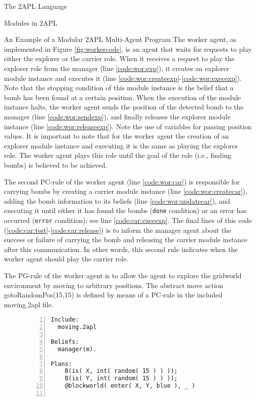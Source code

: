 \begin{chapter}{The 2APL Language}
\begin{section}{Modules in 2APL}
\begin{subsection}{An Example of a Modular 2APL Multi-Agent Program}
The worker agent, as implemented in Figure \ref{fig:workercode}, is
an agent that waits for requests to play either the explorer or the
carrier role. When it receives a request to play the explorer role
from the manager (line \ref{code:wor:exp}), it creates an explorer
module instance and executes it (line
\ref{code:wor:createexp}-\ref{code:wor:execexp}). Note that the
stopping condition of this module instance is the belief that a bomb
has been found at a certain position. When the execution of the
module instance halts, the worker agent sends the position of the
detected bomb to the manager (line \ref{code:wor:sendexp}), and
finally releases the explorer module instance (line
\ref{code:wor:releaseexp}). Note the use of variables for passing
position values. It is important to note that for the worker agent
the creation of an explorer module instance and executing it is the
same as playing the explorer role. The worker agent plays this role
until the goal of the role (i.e., finding bombs) is believed to be
achieved.

The second PC-rule of the worker agent (line \ref{code:wor:car}) is
responsible for carrying bombs by creating a carrier module instance
(line \ref{code:wor:createcar}), adding the bomb information to its
beliefs (line \ref{code:wor:updatecar}), and executing it until
either it has found the bombs (\texttt{done} condition) or an error
has occurred (\texttt{error} condition); see line
\ref{code:car:execexp}. The final lines of this code
(\ref{code:car:test}-\ref{code:car:release}) is to inform the
manager agent about the success or failure of carrying the bomb and
releasing the carrier module instance after this communication. In
other words, this second rule indicates when the worker agent should
play the carrier role.

The PG-rule of the worker agent is to allow the agent to explore the
gridworld environment by moving to arbitrary positions. The abstract
move action \ttt gotoRandomPos(15,15) \ttt is defined by means of a
PC-rule in the included \ttt moving.2apl \ttt file.

\begin{figure}[H]
\begin{Verbatim}[frame=single,numbers=left,firstnumber=last,
                 numbersep=2pt,commandchars=\\\[\]]
Include:
  moving.2apl

Beliefs:
  manager(m).

Plans:
    B(is( X, int( random( 15 ) ) ));
    B(is( Y, int( random( 15 ) ) ));
    @blockworld( enter( X, Y, blue ), _ )


\end{Verbatim}
\end{figure}
\end{subsection}
\end{section}
\end{chapter}

